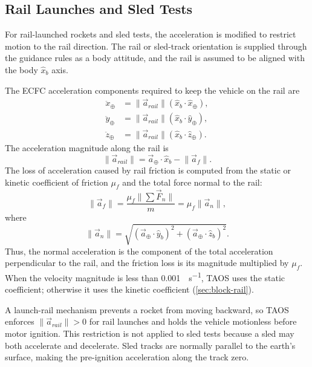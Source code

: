 \subsection{Rail Launches and Sled Tests}\label{sec:rail-launches}

For rail-launched rockets and sled tests, the acceleration is modified to restrict
motion to the rail direction. The rail or sled-track orientation is supplied through
the guidance rules as a body attitude, and the rail is assumed to be aligned with the
body $\hat x_b$ axis.

The ECFC acceleration components required to keep the vehicle on the rail are
\begin{equation}
  \begin{aligned}
    \ddot x_{\oplus}
      &=\lVert\vec a_{rail}\rVert
        \left(\hat x_b\mathbin{\cdot}\hat x_{\oplus}\right),\\
    \ddot y_{\oplus}
      &=\lVert\vec a_{rail}\rVert
        \left(\hat x_b\mathbin{\cdot}\hat y_{\oplus}\right),\\
    \ddot z_{\oplus}
      &=\lVert\vec a_{rail}\rVert
        \left(\hat x_b\mathbin{\cdot}\hat z_{\oplus}\right).
  \end{aligned}
  \label{eq:rail-constrained-acceleration-components}
\end{equation}
The acceleration magnitude along the rail is
\begin{equation}
  \lVert\vec a_{rail}\rVert
  =\vec a_{\oplus}\mathbin{\cdot}\hat x_b
   -\lVert\vec a_f\rVert.
  \label{eq:rail-acceleration-magnitude}
\end{equation}
The loss of acceleration caused by rail friction is computed from the static or
kinetic coefficient of friction $\mu_f$ and the total force normal to the rail:
\begin{equation}
  \lVert\vec a_f\rVert
  =\frac{\mu_f\lVert\sum\vec F_n\rVert}{m}
  =\mu_f\lVert\vec a_n\rVert,
  \label{eq:rail-friction-acceleration}
\end{equation}
where
\begin{equation}
  \lVert\vec a_n\rVert
  =\sqrt{
      \left(\vec a_{\oplus}\mathbin{\cdot}\hat y_b\right)^2
      +\left(\vec a_{\oplus}\mathbin{\cdot}\hat z_b\right)^2
    }.
  \label{eq:rail-normal-acceleration}
\end{equation}
Thus, the normal acceleration is the component of the total acceleration
perpendicular to the rail, and the friction loss is its magnitude multiplied by
$\mu_f$. When the velocity magnitude is less than \SI{0.001}{\foot\per\second},
TAOS uses the static coefficient; otherwise it uses the kinetic coefficient
(\cref{sec:block-rail}).

A launch-rail mechanism prevents a rocket from moving backward, so TAOS enforces
$\lVert\vec a_{rail}\rVert>0$ for rail launches and holds the vehicle motionless
before motor ignition. This restriction is not applied to sled tests because a sled
may both accelerate and decelerate. Sled tracks are normally parallel to the earth's
surface, making the pre-ignition acceleration along the track zero.
